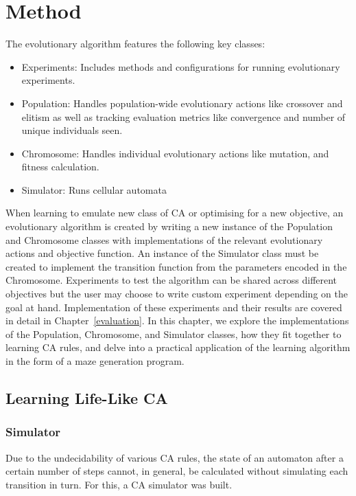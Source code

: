 \chapter{Method} \label{method}

The evolutionary algorithm features the following key classes:
\begin{itemize}
    \item Experiments: Includes methods and configurations for running evolutionary experiments.
    \item Population: Handles population-wide evolutionary actions like crossover and elitism as well as tracking evaluation metrics like convergence and number of unique individuals seen.
    \item Chromosome: Handles individual evolutionary actions like mutation, and fitness calculation.
    \item Simulator: Runs cellular automata
\end{itemize}

When learning to emulate new class of CA or optimising for a new objective, an evolutionary algorithm is created by writing a new instance of the Population and Chromosome classes with implementations of the relevant evolutionary actions and objective function. An instance of the Simulator class must be created to implement the transition function from the parameters encoded in the Chromosome. Experiments to test the algorithm can be shared across different objectives but the user may choose to write custom experiment depending on the goal at hand. Implementation of these experiments and their results are covered in detail in Chapter~\ref{evaluation}. In this chapter, we explore the implementations of the Population, Chromosome, and Simulator classes, how they fit together to learning CA rules, and delve into a practical application of the learning algorithm in the form of a maze generation program.

\section{Learning Life-Like CA}

\subsection{Simulator} \label{subsec:simulator}
Due to the undecidability of various CA rules, the state of an automaton after a certain number of steps cannot, in general, be calculated without simulating each transition in turn. For this, a CA simulator was built.\\

